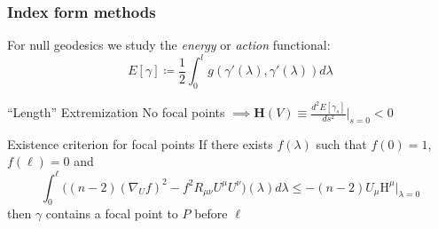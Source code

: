 \documentclass[handout]{beamer}
\begin{document}
	\begin{frame}
		\frametitle{Index form methods}
		For null geodesics we study the \emph{energy} or \emph{action} functional:
		\[
			E[\gamma] \coloneqq \frac{1}{2}\int_{0}^{l} g(\gamma'(\lambda), \gamma'(\lambda))d\lambda	
		\]
		\begin{ideablock}{``Length'' Extremization}
			\centering
			No focal points \(\implies \textbf{H}(V) \equiv\frac{d^2E[\gamma_s]}{ds^2}\Big\vert_{s = 0} < 0\)
		\end{ideablock}
	
		\begin{theoblock}{Existence criterion for focal points}
			If there exists \(f(\lambda)\) such that \(f(0) = 1\), \(f(\ell) = 0\) and
			\[
				\int_{0}^{\ell} \big((n -2)(\nabla_Uf)^2 - f^2R_{\mu\nu}U^{\mu}U^{\nu} \big)(\lambda) d\lambda\le -(n-2)U_{\mu}\mathrm{H}^{\mu}\Big\vert_{\lambda = 0}	
			\]
			then \(\gamma\) contains a focal point to \(P\) before \(\ell\)
		\end{theoblock}
	\end{frame}
\end{document}

